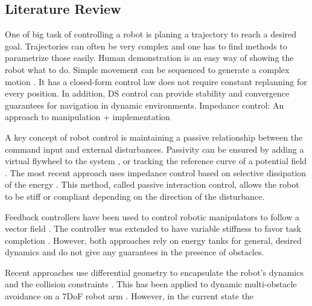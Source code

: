 \documentclass[conference]{IEEEtran}
\begin{document}
\subsection{Literature Review}
One of big task of controlling a robot is planing a trajectory to reach a desired goal. Trajectories can often be very complex and one has to find methods to parametrize those easily. Human demonstration is an easy way of showing the robot what to do. Simple movement can be sequenced to generate a complex motion \cite{gribovskaya2011motion}.
It has a closed-form control law does not require constant replanning for every position. In addition, DS control can provide stability and convergence guarantees for navigation in dynamic environments.
Impedance control: An approach to manipulation + implementation
\cite{hogan1984impedance, hogan1985impedance}


A key concept of robot control is maintaining a passive relationship between the command input and external disturbances. Passivity can be ensured by adding a virtual flywheel to the system \cite{li1999passive, kishi2003passive}, or tracking the reference curve of a potential field \cite{duindam2004passive}. The most recent approach uses impedance control based on selective dissipation of the energy \cite{kronander2015passive}. This method, called passive interaction control, allows the robot to be stiff or compliant depending on the direction of the disturbance.

Feedback controllers have been used to control robotic manipulators to follow a vector field \cite{li1999passive}. The controller was extended to have variable stiffness to favor task completion \cite{kronander2015passive}. However, both approaches rely on energy tanks for general, desired dynamics and do not give any guarantees in the presence of obstacles.

Recent approaches use differential geometry to encapsulate the robot's dynamics and the collision constraints \cite{peters2008unifying}.
This has been applied to dynamic multi-obstacle avoidance on a 7DoF robot arm \cite{van2022geometric}. However, in the current state the 
\end{document}
